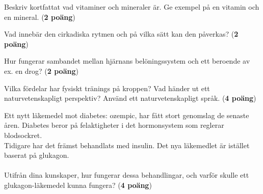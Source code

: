 \documentclass[a4paper,12pt]{exam}  %
\begin{document}
\begin{questions}
\vspace{12mm}

\newpage

\begin{center}
\end{center}

\question Beskriv kortfattat vad vitaminer och mineraler är. Ge exempel på en vitamin och en mineral. (\textbf{2 poäng})
\vspace{60mm}

\question Vad innebär den cirkadiska rytmen och på vilka sätt kan den påverkas?   (\textbf{2 poäng})
\vspace{60mm}

\question Hur fungerar sambandet mellan hjärnans belöningssystem och ett beroende av ex. en drog? (\textbf{2 poäng})

\break

\begin{center}
\end{center}

\question Vilka fördelar har fysiskt tränings på kroppen? Vad händer ut ett naturvetenskapligt perspektiv? Använd ett naturvetenskapligt språk. (\textbf{4 poäng})
\vspace{80mm}

\question Ett nytt läkemedel mot diabetes: ozempic, har fått stort genomslag de senaste åren. Diabetes beror på felaktigheter i det hormonsystem som reglerar blodsockret. 
\\ Tidigare har det främst behandlats med insulin. Det nya läkemedlet är istället baserat på glukagon. \\ \\ Utifrån dina kunskaper, hur fungerar dessa behandlingar, och varför skulle ett glukagon-läkemedel kunna fungera? (\textbf{4 poäng})

\end{questions}
\end{document}
